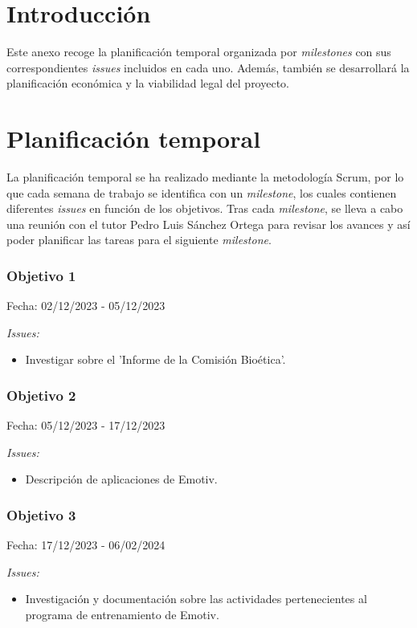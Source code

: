 
\section{Introducción}

Este anexo recoge la planificación temporal organizada por \textit{milestones} con sus correspondientes \textit{issues} incluidos en cada uno. Además, también se desarrollará la planificación económica y la viabilidad legal del proyecto.

\section{Planificación temporal}
La planificación temporal se ha realizado mediante la metodología Scrum, por lo que cada semana de trabajo se identifica con un \textit{milestone}, los cuales contienen diferentes \textit{issues} en función de los objetivos. Tras cada \textit{milestone}, se lleva a cabo una reunión con el tutor Pedro Luis Sánchez Ortega para revisar los avances y así poder planificar las tareas para el siguiente \textit{milestone}.

\subsubsection{Objetivo 1}
Fecha: 02/12/2023 - 05/12/2023

\textit{Issues:}
\begin{itemize}
    \item Investigar sobre el 'Informe de la Comisión Bioética'.
\end{itemize}

\subsubsection{Objetivo 2}
Fecha: 05/12/2023 - 17/12/2023

\textit{Issues:}
\begin{itemize}
    \item Descripción de aplicaciones de Emotiv.
\end{itemize}

\subsubsection{Objetivo 3}
Fecha: 17/12/2023 - 06/02/2024

\textit{Issues:}
\begin{itemize}
    \item Investigación y documentación sobre las actividades pertenecientes al programa de entrenamiento de Emotiv.
\end{itemize}


